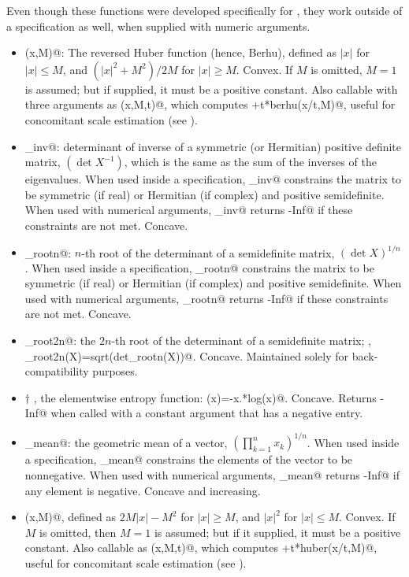 \documentclass[12pt]{article}
\begin{document}
Even though these functions were developed specifically for \cvx, they work
outside of a \cvx specification as well, when supplied with numeric arguments.
\begin{itemize}
\item \verb@berhu(x,M)@: The reversed Huber function (hence, Berhu), defined as
$|x|$ for $|x|\leq M$, and $(|x|^2+M^2)/2M$ for $|x|\geq M$. Convex. If $M$
is omitted, $M=1$ is assumed; but if supplied, it must be a positive constant.
Also callable with three arguments 
as \verb@berhu(x,M,t)@, which computes \verb@t+t*berhu(x/t,M)@,
useful for concomitant scale estimation (see \cite{Owen}).

\item \verb@det_inv@: determinant of inverse of a symmetric (or Hermitian)
positive definite matrix, $(\det X^{-1})$, which is the same as the
sum of the inverses of the eigenvalues.
When used inside a \cvx specification, \verb@det_inv@ constrains
the matrix to be symmetric (if real) or Hermitian (if complex) and 
positive semidefinite. 
When used with numerical arguments, \verb@det_inv@ returns 
\verb@-Inf@ if these constraints are not met. Concave.

\item \verb@det_rootn@: $n$-th root of the determinant of a semidefinite matrix,
$(\det X)^{1/n}$. When used inside a \cvx specification, \verb@det_rootn@ constrains
the matrix to be symmetric (if real) or Hermitian (if complex) and positive semidefinite. 
When used with numerical arguments, \verb@det_rootn@ returns \verb@-Inf@ if these
constraints are not met. Concave.

\item \verb@det_root2n@: the $2n$-th root of the determinant of a semidefinite
matrix; \ie, \verb@det_root2n(X)=sqrt(det_rootn(X))@. Concave. Maintained
solely for back-compatibility purposes.
\item $\dagger$ \verb@entr@, the elementwise
entropy function: \verb@entr(x)=-x.*log(x)@. Concave.  Returns \verb@-Inf@ when
called with a constant argument that has a negative entry.

\item \verb@geo_mean@: the geometric mean of a vector, $\left( \prod_{k=1}^n x_k \right)^{1/n}$. When
used inside a \cvx specification, \verb@geo_mean@ constrains the elements of the vector
to be nonnegative. When used with numerical arguments, \verb@geo_mean@ returns \verb@-Inf@
if any element is negative.
Concave and increasing.

\item \verb@huber(x,M)@, defined as $2M|x|-M^2$ for $|x|\geq M$,
and $|x|^2$ for $|x|\leq M$. Convex. If $M$ is omitted, then $M=1$ is
assumed; but if it supplied, it must be a positive constant.
Also callable as \verb@huber(x,M,t)@, which computes \verb@t+t*huber(x/t,M)@,
useful for concomitant scale estimation
(see \cite{Owen}).


\end{itemize}
\end{document}
